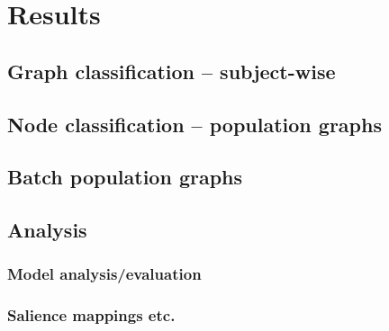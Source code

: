 \chapter{Results}

\section{Graph classification -- subject-wise}

\section{Node classification -- population graphs}

\section{Batch population graphs}

\section{Analysis}
\subsection{Model analysis/evaluation}
\subsection{Salience mappings etc.}